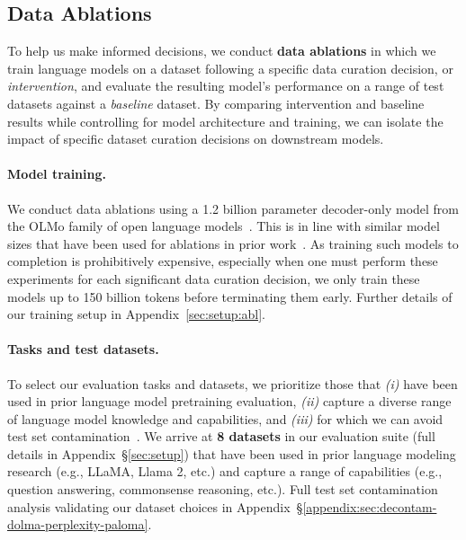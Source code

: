 \documentclass{article}
\begin{document}
\subsection{Data Ablations}
\label{sec:experimental-methodology}

To help us make informed decisions, we conduct \textbf{data ablations} 
in which we train language models on a dataset following a specific data curation decision, or \emph{intervention}, and evaluate the resulting model's performance on a range of test datasets against a \emph{baseline} dataset.
By comparing intervention and baseline results while controlling for model architecture and training, we can isolate the impact of specific dataset curation decisions on downstream models.

\paragraph{Model training.}
We conduct data ablations using a 1.2 billion parameter decoder-only model from the OLMo family of open language models~\citep{olmo20247b}.
This is in line with similar model sizes that have been used for ablations in prior work~\citep{le-scao-etal-2022-language}.
As training such models to completion is prohibitively expensive, especially when one must perform these experiments for each significant data curation decision, we only train these models up to 150 billion tokens before terminating them early.
Further details of our training setup in Appendix~\ref{sec:setup:abl}.

\paragraph{Tasks and test datasets.} 
To select our evaluation tasks and datasets, we prioritize those that \emph{(i)} have been used in prior language model pretraining evaluation, \emph{(ii)} capture a diverse range of language model knowledge and capabilities, and \emph{(iii)} for which we can avoid test set contamination~\citep{dodge-etal-2021-documenting,Yang2023RethinkingBA}.
We arrive at \textbf{8 datasets} in our evaluation suite (full details in Appendix~\S\ref{sec:setup}) that have been used in prior language modeling research (e.g., LLaMA, Llama 2, etc.) and capture a range of capabilities (e.g., question answering, commonsense reasoning, etc.).  
Full test set contamination analysis validating our dataset choices in Appendix~\S\ref{appendix:sec:decontam-dolma-perplexity-paloma}.
\end{document}
